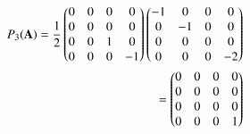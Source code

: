 \begin{enumerate}
{\begin{align}
P_3(\mathbf{A})=\frac{1}{2}\begin{pmatrix}0&0&0&0\\0&0&0&0\\0&0&1&0\\0&0&0&-1\end{pmatrix}\begin{pmatrix}-1&0&0&0\\0&-1&0&0\\0&0&0&0\\0&0&0&-2\end{pmatrix}\\=\begin{pmatrix}0&0&0&0\\0&0&0&0\\0&0&0&0\\0&0&0&1\end{pmatrix}
\end{align}}
\end{enumerate}

